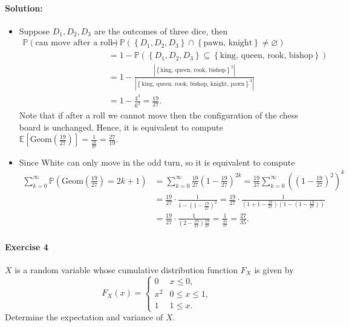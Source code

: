 \documentclass[a4paper,12pt]{article}
\begin{document}
\paragraph{Solution:}
\begin{itemize}
	\item [(a)] Suppose \(D_1, D_2, D_3\) are the outcomes of three dice, then 
	\begin{align*}
		\mathbb{P} (\text{can move after a roll}) &= \mathbb{P} (\left\{ D_1, D_2, D_3 \right\} \cap \left\{ \text{pawn, knight}  \right\} \neq \varnothing   ) \\
		&= 1 - \mathbb{P} (\left\{ D_1, D_2, D_3 \right\} \subseteq \left\{ \text{king, queen, rook, bishop}  \right\}  ) \\
		&= 1 - \frac{\left\vert \left\{ \text{king, queen, rook, bishop}  \right\}^3 \right\vert }{\left\vert \left\{ \text{king, queen, rook, bishop, knight, pawn} \right\}^3 \right\vert  }\\
		&= 1 - \frac{4^3}{6^3} = \frac{19}{27}.
	\end{align*} 
	Note that if after a roll we cannot move then the configuration of the chess board is unchanged. Hence, it is equivalent to compute \(\mathbb{E} \left[ \mathrm{Geom} \left( \frac{19}{27} \right)   \right] = \frac{1}{\frac{19}{27}} = \frac{27}{19}\). 
	\item [(b)] Since White can only move in the odd turn, so it is equivalent to compute 
	\begin{align*}
		\sum_{k=0}^{\infty} \mathbb{P} \left( \mathrm{Geom} \left( \frac{19}{27} \right)   = 2k + 1 \right) &= \sum_{k=0}^{\infty} \frac{19}{27} \left( 1 - \frac{19}{27} \right)^{2k} = \frac{19}{27} \sum_{k=0}^{\infty} \left( \left( 1 - \frac{19}{27} \right)^2  \right)^k \\
		&= \frac{19}{27} \cdot \frac{1}{1 - \left( 1 - \frac{19}{27} \right)^2} = \frac{19}{27} \cdot \frac{1}{\left( 1 + 1 - \frac{19}{27} \right) \left( 1 - (1 - \frac{19}{27}) \right)  } \\
		&= \frac{19}{27} \cdot \frac{1}{\left( 2 - \frac{19}{27} \right)\frac{19}{27}  } = \frac{1}{\frac{35}{27}} = \frac{27}{35}. 
	\end{align*}
\end{itemize}

\paragraph{Exercise 4}  $X$ is a random variable whose cumulative distribution function $F_X$ is given by
\[ F_X(x) = \begin{cases}
	0 & x \le 0, \\
	x^2 & 0 \le x \le 1, \\
	1 & 1 \le x.
\end{cases} \]
Determine the expectation and variance of $X$.
\end{document}
